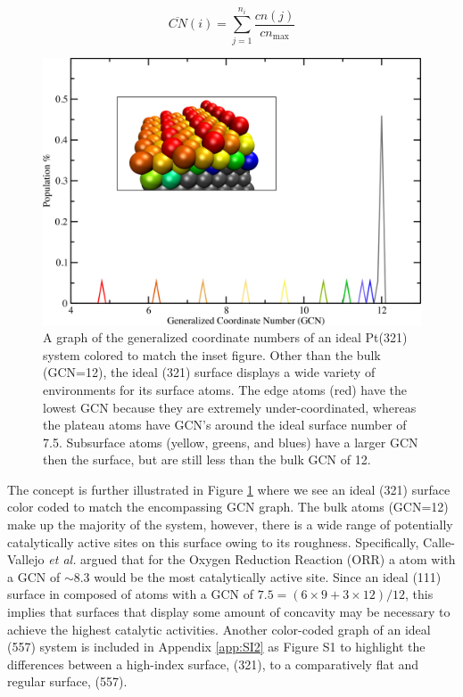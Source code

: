 \begin{equation}
  \overline{CN}(i) = \sum_{j=1}^{n_i}\frac{cn(j)}{cn_{\textrm{max}}}
  \label{eq:gcn}
\end{equation}

\begin{figure}[p!]
  \includegraphics[width=\linewidth]{../figures/chap4/321_ideal_gcn.pdf}
  \caption{A graph of the generalized coordinate numbers of an ideal Pt(321)
system colored to match the inset figure. Other than the bulk (GCN=12), the
ideal (321) surface displays a wide variety of environments for its surface
atoms.  The edge atoms (red) have the lowest GCN because they are extremely
under-coordinated, whereas the plateau atoms have GCN's around the ideal
surface number of 7.5. Subsurface atoms (yellow, greens, and blues) have a
larger GCN then the surface, but are still less than the bulk GCN of 12.  }
\label{fig:ideal321GCN}
\end{figure}

The concept is further illustrated in Figure \ref{fig:ideal321GCN} where we see
an ideal  (321) surface color coded to match the encompassing GCN graph.
The bulk atoms (GCN=12) make up the majority of the system, however, there is a
wide range of potentially catalytically active sites on this surface owing to
its roughness. Specifically, Calle-Vallejo {\em et al.} argued that for the
Oxygen Reduction Reaction (ORR) a  atom with a GCN of $\sim$8.3 would be the
most catalytically active site. Since an ideal (111) surface in composed of
atoms with a GCN of $7.5=(6\times9 + 3\times12)/12$, this implies that surfaces
that display some amount of concavity may be necessary to achieve the highest
catalytic activities. Another color-coded graph of an ideal  (557)
system is included in Appendix \ref{app:SI2} as Figure S1 to highlight the
differences between a high-index surface, (321), to a comparatively flat and
regular surface, (557).

